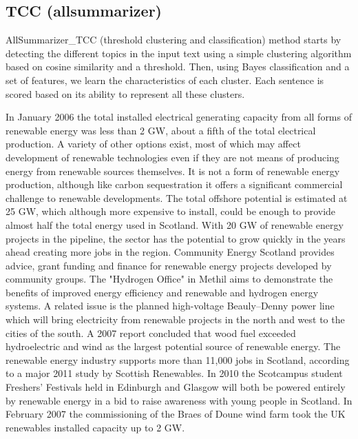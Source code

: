\subsection{TCC (allsummarizer)}

AllSummarizer\_TCC (threshold clustering and classification) method \citep{15-aries-al} starts by detecting the different topics in the input text using a simple clustering algorithm based on cosine similarity and a threshold.
Then, using Bayes classification and a set of features, we learn the characteristics of each cluster. 
Each sentence is scored based on its ability to represent all these clusters. 

\begin{tcolorbox}\footnotesize
	In January 2006 the total installed electrical generating capacity from all forms of renewable energy was less than 2 GW, about a fifth of the total electrical production.
	A variety of other options exist, most of which may affect development of renewable technologies even if they are not means of producing energy from renewable sources themselves.
	It is not a form of renewable energy production, although like carbon sequestration it offers a significant commercial challenge to renewable developments.
	The total offshore potential is estimated at 25 GW, which although more expensive to install, could be enough to provide almost half the total energy used in Scotland.
	With 20 GW of renewable energy projects in the pipeline, the sector has the potential to grow quickly in the years ahead creating more jobs in the region.
	Community Energy Scotland provides advice, grant funding and finance for renewable energy projects developed by community groups.
	The "Hydrogen Office" in Methil aims to demonstrate the benefits of improved energy efficiency and renewable and hydrogen energy systems.
	A related issue is the planned high-voltage Beauly–Denny power line which will bring electricity from renewable projects in the north and west to the cities of the south.
	A 2007 report concluded that wood fuel exceeded hydroelectric and wind as the largest potential source of renewable energy.
	The renewable energy industry supports more than 11,000 jobs in Scotland, according to a major 2011 study by Scottish Renewables.
	In 2010 the Scotcampus student Freshers' Festivals held in Edinburgh and Glasgow will both be powered entirely by renewable energy in a bid to raise awareness with young people in Scotland.
	In February 2007 the commissioning of the Braes of Doune wind farm took the UK renewables installed capacity up to 2 GW.
\end{tcolorbox}

